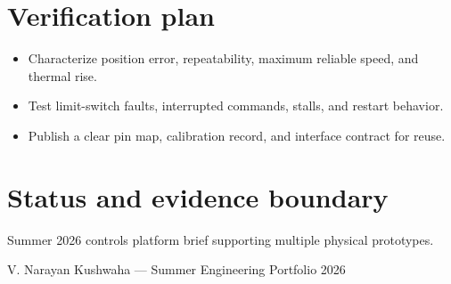 \documentclass[10pt]{article}
\begin{document}
\section*{Verification plan}
\begin{itemize}
\item Characterize position error, repeatability, maximum reliable speed, and thermal rise.
\item Test limit-switch faults, interrupted commands, stalls, and restart behavior.
\item Publish a clear pin map, calibration record, and interface contract for reuse.
\end{itemize}

\section*{Status and evidence boundary}
Summer 2026 controls platform brief supporting multiple physical prototypes.

\vfill
\small\color{muted} V. Narayan Kushwaha --- Summer Engineering Portfolio 2026
\end{document}
